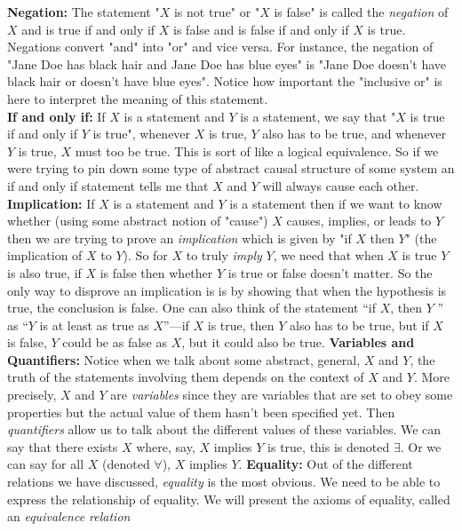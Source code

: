 \documentclass[../main.tex]{subfiles}
\begin{document}
\textbf{Negation:} The statement "$X$ is not true" or "$X$ is false" is called the \textit{negation} of $X$ and is true if and only if $X$ is false and is false if and only if $X$ is true. Negations convert "and" into "or" and vice versa. For instance, the negation of "Jane Doe has black hair and Jane Doe has blue eyes" is "Jane Doe doesn't have black hair or doesn't have blue eyes". Notice how important the "inclusive or" is here to interpret the meaning of this statement. \\
\textbf{If and only if:} If $X$ is a statement and $Y$ is a statement, we say that "$X$ is true if and only if $Y$ is true", whenever $X$ is true, $Y$ also has to be true, and whenever $Y$ is true, $X$ must too be true. This is sort of like a logical equivalence. So if we were trying to pin down some type of abstract causal structure of some system an if and only if statement tells me that $X$ and $Y$ will always cause each other.\\
\textbf{Implication:} If $X$ is a statement and $Y$ is a statement then if we want to know whether (using some abstract notion of "cause") $X$ causes, implies, or leads to $Y$ then we are trying to prove an \textit{implication} which is given by "if $X$ then $Y$" (the implication of $X$ to $Y$). So for $X$ to truly \textit{imply} $Y$, we need that when $X$ is true $Y$ is also true, if $X$ is false then whether $Y$ is true or false doesn't matter. So the only way to disprove an implication is is by showing that when the hypothesis is true, the conclusion is false. One can also think of the statement “if $X$, then $Y$ ” as “$Y$ is at least as true as $X$”—if $X$ is true, then $Y$ also has to be true, but if $X$ is false, $Y$ could be as false as $X$, but it could also be true. 
\textbf{Variables and Quantifiers:} Notice when we talk about some abstract, general, $X$ and $Y$, the truth of the statements involving them depends on the context of $X$ and $Y$. More precisely, $X$ and $Y$ are \textit{variables} since they are variables that are set to obey some properties but the actual value of them hasn't been specified yet. Then \textit{quantifiers} allow us to talk about the different values of these variables. We can say that there exists $X$ where, say, $X$ implies $Y$ is true, this is denoted \(\exists\). Or we can say for all $X$ (denoted $\forall$), $X$ implies $Y$. 
\textbf{Equality:} Out of the different relations we have discussed, \textit{equality} is the most obvious. We need to be able to express the relationship of equality. We will present the axioms of equality, called an \textit{equivalence relation}
\end{document}
